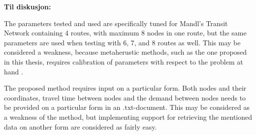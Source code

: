 \textbf{\color{blue} Til diskusjon:}

The parameters tested and used are specifically tuned for Mandl's Transit Network containing 4 routes, with maximum 8 nodes in one route, but the same parameters are used when testing with 6, 7, and 8 routes as well. This may be considered a weakness, because metaherustic methods, such as the one proposed in this thesis, requires calibration of parameters with respect to the problem at hand \citep{dobslaw09}.

The proposed method requires input on a particular form. Both nodes and their coordinates, travel time between nodes and the demand between nodes needs to be provided on a particular form in an .txt-document. This may be considered as a weakness of the method, but implementing support for retrieving the mentioned data on another form are considered as fairly easy.

